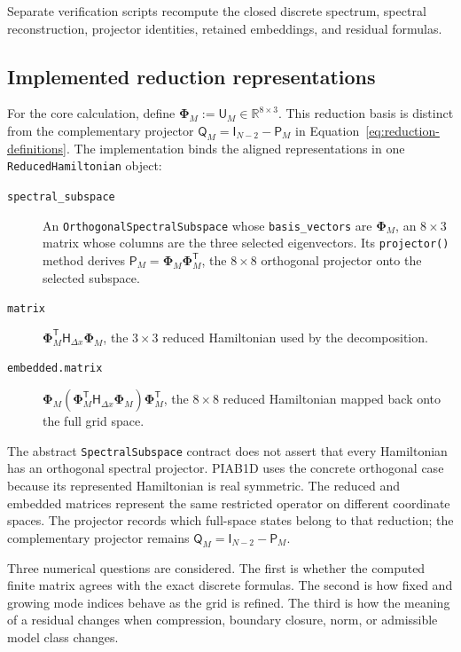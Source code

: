 \documentclass[11pt]{article}
\newcommand{\RR}{\mathbb{R}}
\newcommand{\mat}[1]{\mathsf{#1}}
\begin{document}
Separate verification scripts recompute the closed discrete spectrum, spectral
reconstruction, projector identities, retained embeddings, and residual formulas.

\subsection{Implemented reduction representations}

For the core calculation, define
$\boldsymbol{\Phi}_M:=\mat{U}_M\in\RR^{8\times3}$. This reduction basis is distinct
from the complementary projector $\mat{Q}_M=\mat{I}_{N-2}-\mat{P}_M$ in
Equation~\eqref{eq:reduction-definitions}. The implementation binds the aligned
representations in one \texttt{ReducedHamiltonian} object:
\begin{description}
 \item[\texttt{spectral\_subspace}] An
 \texttt{OrthogonalSpectralSubspace} whose \texttt{basis\_vectors} are
 $\boldsymbol{\Phi}_M$, an $8\times3$ matrix whose columns are the three selected
 eigenvectors. Its \texttt{projector()} method derives
 $\mat{P}_M=\boldsymbol{\Phi}_M\boldsymbol{\Phi}_M^{\mathsf T}$, the $8\times8$
 orthogonal projector onto the selected subspace.
 \item[\texttt{matrix}]
 $\boldsymbol{\Phi}_M^{\mathsf T}\mat{H}_{\Delta x}\boldsymbol{\Phi}_M$,
 the $3\times3$ reduced Hamiltonian used by the decomposition.
 \item[\texttt{embedded.matrix}]
 $\boldsymbol{\Phi}_M
 (\boldsymbol{\Phi}_M^{\mathsf T}\mat{H}_{\Delta x}\boldsymbol{\Phi}_M)
 \boldsymbol{\Phi}_M^{\mathsf T}$, the $8\times8$ reduced Hamiltonian mapped back
 onto the full grid space.
\end{description}
The abstract \texttt{SpectralSubspace} contract does not assert that every Hamiltonian
has an orthogonal spectral projector. PIAB1D uses the concrete orthogonal case because
its represented Hamiltonian is real symmetric. The reduced and embedded matrices
represent the same restricted operator on different coordinate spaces. The projector
records which full-space states belong to that reduction; the complementary projector
remains $\mat{Q}_M=\mat{I}_{N-2}-\mat{P}_M$.

Three numerical questions are considered. The first is whether the computed finite
matrix agrees with the exact discrete formulas. The second is how fixed and growing
mode indices behave as the grid is refined. The third is how the meaning of a
residual changes when compression, boundary closure, norm, or admissible model class
changes.
\end{document}
